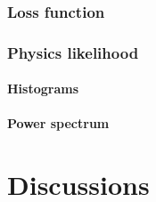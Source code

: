 \documentclass[11pt,a4paper]{report}
\begin{document}
\begin{multicols*}{2}
    \subsection{Loss function}

    \subsection{Physics likelihood}
    \subsubsection{Histograms}
    \subsubsection{Power spectrum}

    \chapter{Discussions}


\end{multicols*}
\end{document}
